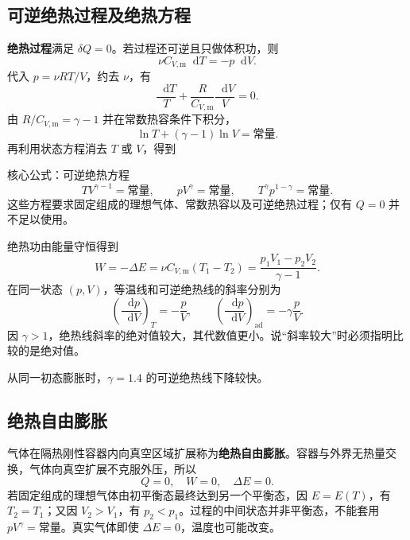 \documentclass[UTF8,fontset=none,zihao=-4,a4paper]{ctexart}
\newcommand{\term}[1]{\textbf{#1}}
\newcommand{\dd}{\mathop{}\!\mathrm{d}}
\begin{document}
\subsection{可逆绝热过程及绝热方程}
\term{绝热过程}满足 $\delta Q=0$。若过程还可逆且只做体积功，则
\[
 \nu C_{V,\mathrm m}\dd T=-p\dd V.
\]
代入 $p=\nu RT/V$，约去 $\nu$，有
\[
 \frac{\dd T}{T}+\frac{R}{C_{V,\mathrm m}}\frac{\dd V}{V}=0.
\]
由 $R/C_{V,\mathrm m}=\gamma-1$ 并在常数热容条件下积分，
\[
 \ln T+(\gamma-1)\ln V=\text{常量}.
\]
再利用状态方程消去 $T$ 或 $V$，得到
\begin{infobox}{核心公式：可逆绝热方程}
\[
 TV^{\gamma-1}=\text{常量},\qquad
 pV^\gamma=\text{常量},\qquad
 T^\gamma p^{1-\gamma}=\text{常量}.
\]
这些方程要求固定组成的理想气体、常数热容以及可逆绝热过程；仅有 $Q=0$ 并不足以使用。
\end{infobox}
绝热功由能量守恒得到
\[
 W=-\Delta E=\nu C_{V,\mathrm m}(T_1-T_2)
 =\frac{p_1V_1-p_2V_2}{\gamma-1}.
\]
在同一状态 $(p,V)$，等温线和可逆绝热线的斜率分别为
\[
 \left(\frac{\dd p}{\dd V}\right)_T=-\frac pV,
 \qquad
 \left(\frac{\dd p}{\dd V}\right)_{\mathrm{ad}}=-\gamma\frac pV.
\]
因 $\gamma>1$，绝热线斜率的绝对值较大，其代数值更小。说“斜率较大”时必须指明比较的是绝对值。

\begin{center}
\par\small 从同一初态膨胀时，$\gamma=1.4$ 的可逆绝热线下降较快。
\end{center}

\subsection{绝热自由膨胀}
气体在隔热刚性容器内向真空区域扩展称为\term{绝热自由膨胀}。容器与外界无热量交换，气体向真空扩展不克服外压，所以
\[
 Q=0,\quad W=0,\quad\Delta E=0.
\]
若固定组成的理想气体由初平衡态最终达到另一个平衡态，因 $E=E(T)$，有 $T_2=T_1$；又因 $V_2>V_1$，有 $p_2<p_1$。过程的中间状态并非平衡态，不能套用 $pV^\gamma=\text{常量}$。真实气体即使 $\Delta E=0$，温度也可能改变。
\end{document}
